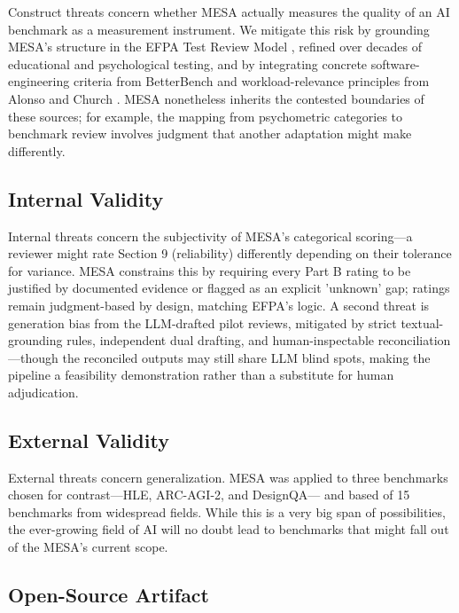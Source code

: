 \documentclass[conference]{IEEEtran}
\begin{document}
        Construct threats concern whether MESA actually measures the quality of an AI benchmark as a measurement instrument. We mitigate this risk by grounding MESA's structure in the EFPA Test Review Model \cite{efpa_test_review_model_2025}, refined over decades of educational and psychological testing, and by integrating concrete software-engineering criteria from BetterBench \cite{reuel_betterbench} and workload-relevance principles from Alonso and Church \cite{alonso_church_sigir}. MESA nonetheless inherits the contested boundaries of these sources; for example, the mapping from psychometric categories to benchmark review involves judgment that another adaptation might make differently.

    \subsection{Internal Validity}

        Internal threats concern the subjectivity of MESA's categorical scoring---a reviewer might rate Section 9 (reliability) differently depending on their tolerance for variance. MESA constrains this by requiring every Part B rating to be justified by documented evidence or flagged as an explicit 'unknown' gap; ratings remain judgment-based by design, matching EFPA's logic. A second threat is generation bias from the LLM-drafted pilot reviews, mitigated by strict textual-grounding rules, independent dual drafting, and human-inspectable reconciliation---though the reconciled outputs may still share LLM blind spots, making the pipeline a feasibility demonstration rather than a substitute for human adjudication.
    
    \subsection{External Validity}
    
        External threats concern generalization. MESA was applied to three benchmarks chosen for contrast---HLE, ARC-AGI-2, and DesignQA--- and based of 15 benchmarks from widespread fields. While this is a very big span of possibilities, the ever-growing field of AI will no doubt lead to benchmarks that might fall out of the MESA's current scope.
    
    \subsection{Open-Source Artifact}
    
\end{document}
